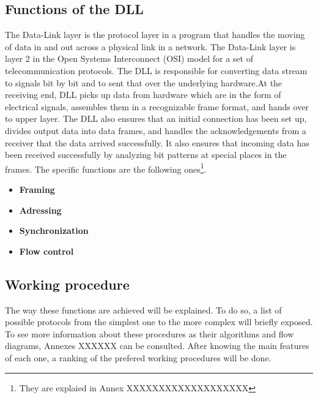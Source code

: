 %
\subsection{Functions of the DLL}
The Data-Link layer is the protocol layer in a program that handles the moving of data in and out across a physical link in a network. The Data-Link layer is layer 2 in the Open Systems Interconnect (OSI) model for a set of telecommunication protocols.
The DLL is responsible for converting data stream to signals bit by bit and to sent that over the underlying hardware.At the receiving end, DLL picks up data from hardware which are in the form of electrical signals, assembles them in a recognizable frame format, and hands over to upper layer. The DLL also ensures that an initial connection has been set up, divides output data into data frames, and handles the acknowledgements from a receiver that the data arrived successfully. It also ensures that incoming data has been received successfully by analyzing bit patterns at special places in the frames. The specific functions are the following ones\footnote{They are explaied in Annex XXXXXXXXXXXXXXXXXXX}.
\begin{itemize}
\item \textbf{Framing}
\item \textbf{Adressing}
\item \textbf{Synchronization}
\item \textbf{Flow control}
 \end{itemize}
\subsection{Working procedure}
The way these functions are achieved will be explained. To do so, a list of possible protocols from the simplest one to the more complex will briefly exposed. To see more information about these procedures as their algorithms and flow diagrams, Annexes XXXXXX can be consulted. After knowing the main features of each one, a ranking of the prefered working procedures will be done. 
